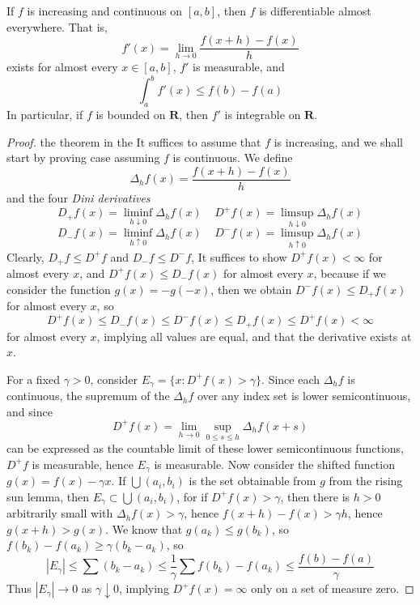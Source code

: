 \begin{theorem}
    If $f$ is increasing and continuous on $[a,b]$, then $f$ is differentiable almost everywhere. That is,
    \[ f'(x) = \lim_{h \to 0} \frac{f(x+h) - f(x)}{h} \]
    exists for almost every $x \in [a,b]$, $f'$ is measurable, and
    \[ \int_a^b f'(x) \leq f(b) - f(a) \]
    In particular, if $f$ is bounded on $\mathbf{R}$, then $f'$ is integrable on $\mathbf{R}$.
\end{theorem}
\begin{proof}the theorem in the
    It suffices to assume that $f$ is increasing, and we shall start by proving case assuming $f$ is continuous. We define
    \[ \Delta_h f (x) = \frac{f(x+h) - f(x)}{h} \]
    and the four {\it Dini derivatives}
    \[ D_+ f(x) = \liminf_{h \downarrow 0} \Delta_h f(x)\ \ \ \ \ D^+ f(x) = \limsup_{h \downarrow 0} \Delta_h f(x) \]
    \[ D_- f(x) = \liminf_{h \uparrow 0} \Delta_h f(x)\ \ \ \ \ D^- f(x) = \limsup_{h \uparrow 0} \Delta_h f(x) \]
    Clearly, $D_+ f \leq D^+ f$ and $D_- f \leq D^- f$, It suffices to show $D^+ f(x) < \infty$ for almost every $x$, and $D^+ f(x) \leq D_- f(x)$ for almost every $x$, because if we consider the function $g(x) = -g(-x)$, then we obtain $D^- f(x) \leq D_+ f(x)$ for almost every $x$, so
    \[ D^+ f (x) \leq D_- f(x) \leq D^- f(x) \leq D_+ f(x) \leq D^+ f(x) < \infty \]
    for almost every $x$, implying all values are equal, and that the derivative exists at $x$.

    For a fixed $\gamma > 0$, consider $E_\gamma = \{ x: D^+ f (x) > \gamma \}$. Since each $\Delta_h f$ is continuous, the supremum of the $\Delta_h f$ over any index set is lower semicontinuous, and since
    \[ D^+ f(x) = \lim_{h \to 0} \sup_{0 \leq s \leq h} \Delta_h f (x + s) \]
    can be expressed as the countable limit of these lower semicontinuous functions, $D^+ f$ is measurable, hence $E_\gamma$ is measurable. Now consider the shifted function $g(x) = f(x) - \gamma x$. If $\bigcup (a_i,b_i)$ is the set obtainable from $g$ from the rising sun lemma, then $E_\gamma \subset \bigcup (a_i, b_i)$, for if $D^+ f(x) > \gamma$, then there is $h > 0$ arbitrarily small with $\Delta_h f(x) > \gamma$, hence $f(x + h) - f(x) > \gamma h$, hence $g(x+h) > g(x)$. We know that $g(a_k) \leq g(b_k)$, so $f(b_k) - f(a_k) \geq \gamma(b_k - a_k)$, so
    \[ |E_\gamma| \leq \sum (b_k - a_k) \leq \frac{1}{\gamma} \sum f(b_k) - f(a_k) \leq \frac{f(b) - f(a)}{\gamma} \]
    Thus $|E_\gamma| \to 0$ as $\gamma \downarrow 0$, implying $D^+ f(x) = \infty$ only on a set of measure zero.


\end{proof}
